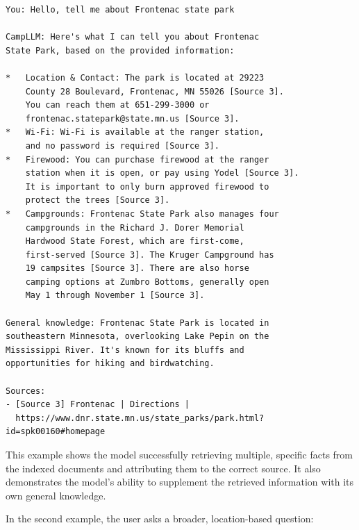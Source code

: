 \documentclass[11pt]{article}
\begin{document}
\begin{lstlisting}[breaklines=true]
You: Hello, tell me about Frontenac state park

CampLLM: Here's what I can tell you about Frontenac 
State Park, based on the provided information:

*   Location & Contact: The park is located at 29223 
    County 28 Boulevard, Frontenac, MN 55026 [Source 3]. 
    You can reach them at 651-299-3000 or 
    frontenac.statepark@state.mn.us [Source 3].
*   Wi-Fi: Wi-Fi is available at the ranger station, 
    and no password is required [Source 3].
*   Firewood: You can purchase firewood at the ranger 
    station when it is open, or pay using Yodel [Source 3]. 
    It is important to only burn approved firewood to 
    protect the trees [Source 3].
*   Campgrounds: Frontenac State Park also manages four 
    campgrounds in the Richard J. Dorer Memorial 
    Hardwood State Forest, which are first-come, 
    first-served [Source 3]. The Kruger Campground has 
    19 campsites [Source 3]. There are also horse 
    camping options at Zumbro Bottoms, generally open 
    May 1 through November 1 [Source 3].

General knowledge: Frontenac State Park is located in 
southeastern Minnesota, overlooking Lake Pepin on the 
Mississippi River. It's known for its bluffs and 
opportunities for hiking and birdwatching.

Sources:
- [Source 3] Frontenac | Directions | 
  https://www.dnr.state.mn.us/state_parks/park.html?id=spk00160#homepage
\end{lstlisting}

This example shows the model successfully retrieving multiple, specific facts from the indexed documents and attributing them to the correct source. It also demonstrates the model's ability to supplement the retrieved information with its own general knowledge.

In the second example, the user asks a broader, location-based question:
\end{document}
